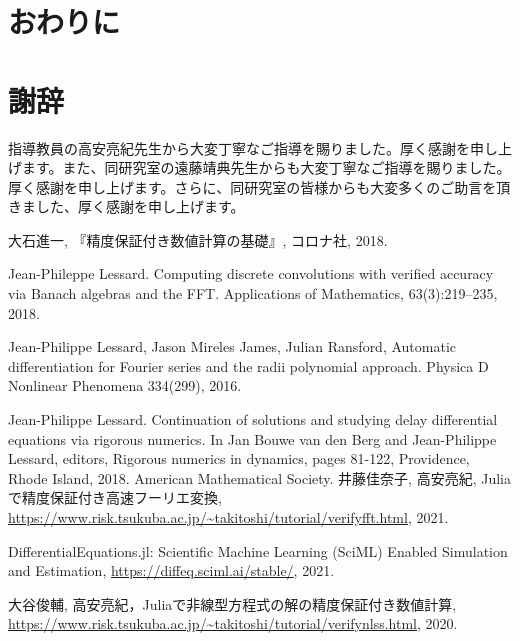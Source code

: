 \documentclass[twoside,twocolumn,a4j,dvipdfmx]{jarticle}
\begin{document}
\section{おわりに}
\Conclusion

\section{謝辞}
指導教員の高安亮紀先生から大変丁寧なご指導を賜りました。厚く感謝を申し上げます。また、同研究室の遠藤靖典先生からも大変丁寧なご指導を賜りました。厚く感謝を申し上げます。さらに、同研究室の皆様からも大変多くのご助言を頂きました、厚く感謝を申し上げます。

\begin{thebibliography}{99}
大石進一, 『精度保証付き数値計算の基礎』, コロナ社, 2018.

Jean-Phileppe Lessard. Computing discrete convolutions with verified accuracy via Banach algebras and the FFT. Applications of Mathematics, 63(3):219–235, 2018.

Jean-Philippe Lessard, Jason Mireles James, Julian Ransford, Automatic differentiation for Fourier series and the radii polynomial approach. Physica D  Nonlinear Phenomena 334(299), 2016.

Jean-Philippe Lessard. Continuation of solutions and studying delay differential equations via rigorous numerics. In Jan Bouwe van den Berg and Jean-Philippe Lessard, editors, Rigorous numerics in dynamics, pages 81-122, Providence, Rhode Island, 2018. American Mathematical Society.
井藤佳奈子, 高安亮紀, Juliaで精度保証付き高速フーリエ変換, \url{https://www.risk.tsukuba.ac.jp/~takitoshi/tutorial/verifyfft.html}, 2021.

DifferentialEquations.jl: Scientific Machine Learning (SciML) Enabled Simulation and Estimation, \url{https://diffeq.sciml.ai/stable/}, 2021.

大谷俊輔, 高安亮紀，Juliaで非線型方程式の解の精度保証付き数値計算, \url{https://www.risk.tsukuba.ac.jp/~takitoshi/tutorial/verifynlss.html}, 2020.

\end{thebibliography}
\end{document}
